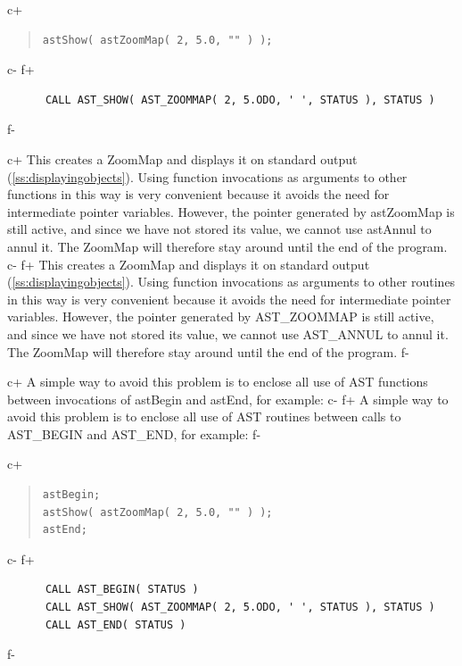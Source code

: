 \documentclass[twoside,11pt]{article}
\newcommand{\secref}[1]{\S\ref{#1}}
\renewcommand{\secref}[1]{\ref{#1}}
\begin{document}
c+
\begin{quote}
\small
\begin{verbatim}
astShow( astZoomMap( 2, 5.0, "" ) );
\end{verbatim}
\normalsize
\end{quote}
c-
f+
\small
\begin{verbatim}
      CALL AST_SHOW( AST_ZOOMMAP( 2, 5.ODO, ' ', STATUS ), STATUS )
\end{verbatim}
\normalsize
f-

c+
This creates a ZoomMap and displays it on standard output
(\secref{ss:displayingobjects}). Using function invocations as
arguments to other functions in this way is very convenient because it
avoids the need for intermediate pointer variables. However, the
pointer generated by astZoomMap is still active, and since we have not
stored its value, we cannot use astAnnul to annul it. The ZoomMap will
therefore stay around until the end of the program.
c-
f+
This creates a ZoomMap and displays it on standard output
(\secref{ss:displayingobjects}). Using function invocations as
arguments to other routines in this way is very convenient because it
avoids the need for intermediate pointer variables. However, the
pointer generated by AST\_ZOOMMAP is still active, and since we have
not stored its value, we cannot use AST\_ANNUL to annul it. The
ZoomMap will therefore stay around until the end of the program.
f-

c+
A simple way to avoid this problem is to enclose all use of AST
functions between invocations of astBegin and astEnd, for example:
c-
f+
A simple way to avoid this problem is to enclose all use of AST
routines between calls to AST\_BEGIN and AST\_END, for example:
f-

c+
\begin{quote}
\small
\begin{verbatim}
astBegin;
astShow( astZoomMap( 2, 5.0, "" ) );
astEnd;
\end{verbatim}
\normalsize
\end{quote}
c-
f+
\small
\begin{verbatim}
      CALL AST_BEGIN( STATUS )
      CALL AST_SHOW( AST_ZOOMMAP( 2, 5.ODO, ' ', STATUS ), STATUS )
      CALL AST_END( STATUS )
\end{verbatim}
\normalsize
f-
\end{document}
